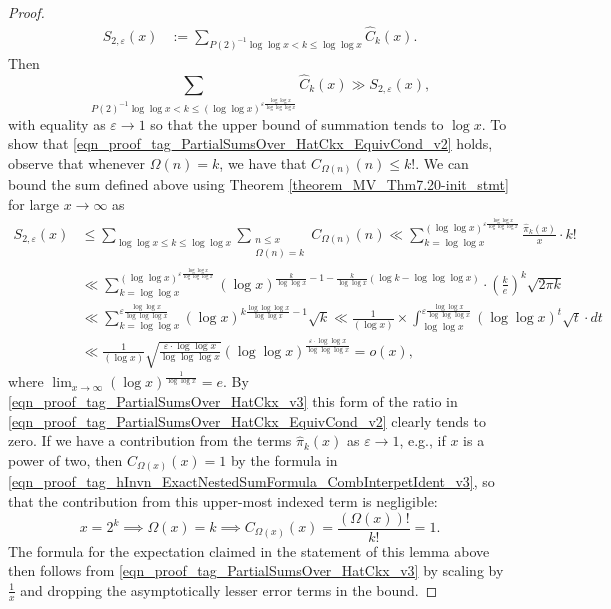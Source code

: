 \documentclass[11pt,reqno,a4letter]{article}
\numberwithin{figure}{section}
\numberwithin{table}{section}
\theoremstyle{plain}
\numberwithin{theorem}{section}
\theoremstyle{definition}
\begin{document}
\begin{proof}
\begin{align*}
S_{2,\varepsilon}(x) & := \sum_{P(2)^{-1} \log\log x < k \leq \log\log x} \widehat{C}_k(x). 
\end{align*} 
Then 
\[
\sum_{P(2)^{-1} \log\log x < k \leq (\log\log x)^{\varepsilon \frac{\log\log x}{\log\log\log x}}} \widehat{C}_k(x) 
     \gg S_{2,\varepsilon}(x),  
\]
with equality as $\varepsilon \rightarrow 1$ so that the upper bound of summation tends to $\log x$. 
To show that \eqref{eqn_proof_tag_PartialSumsOver_HatCkx_EquivCond_v2} holds, 
observe that whenever $\Omega(n) = k$, we have that $C_{\Omega(n)}(n) \leq k!$. 
We can bound the sum defined above using 
Theorem \ref{theorem_MV_Thm7.20-init_stmt} for large $x \rightarrow \infty$ as 
\begin{align*} 
S_{2,\varepsilon}(x) & \leq 
     \sum_{\log\log x \leq k \leq \log\log x} \sum_{\substack{n \leq x \\ \Omega(n)=k}} C_{\Omega(n)}(n) 
     \ll \sum_{k=\log\log x}^{(\log\log x)^{\varepsilon \frac{\log\log x}{\log\log\log x}}} 
      \frac{\widehat{\pi}_k(x)}{x} \cdot k! \\ 
     & \ll \sum_{k=\log\log x}^{(\log\log x)^{\varepsilon \frac{\log\log x}{\log\log\log x}}} 
     (\log x)^{\frac{k}{\log\log x} - 1 - \frac{k}{\log\log x} \left( 
     \log k - \log\log\log x\right)} \cdot \left(\frac{k}{e}\right)^{k} \sqrt{2\pi k} \\ 
     & \ll \sum_{k=\log\log x}^{\varepsilon \frac{\log\log x}{\log\log\log x}} 
     (\log x)^{k \frac{\log\log\log x}{\log\log x} - 1} \sqrt{k} 
     \ll \frac{1}{(\log x)} \times \int_{\log\log x}^{\varepsilon 
     \frac{\log\log x}{\log\log\log x}} (\log\log x)^t \sqrt{t} \cdot dt \\ 
     & \ll \frac{1}{(\log x)} \sqrt{\frac{\varepsilon \cdot \log\log x}{\log\log\log x}} 
     (\log\log x)^{\frac{\varepsilon \cdot \log\log x}{\log\log\log x}} = o(x), 
\end{align*} 
where $\lim_{x \rightarrow \infty} (\log x)^{\frac{1}{\log\log x}} = e$. 
By \eqref{eqn_proof_tag_PartialSumsOver_HatCkx_v3} this 
form of the ratio in \eqref{eqn_proof_tag_PartialSumsOver_HatCkx_EquivCond_v2} clearly tends to zero. 
If we have a contribution from the terms $\widehat{\pi}_k(x)$ as $\varepsilon \rightarrow 1$, 
e.g., if $x$ is a power of two, then $C_{\Omega(x)}(x) = 1$ by the formula in 
\eqref{eqn_proof_tag_hInvn_ExactNestedSumFormula_CombInterpetIdent_v3}, so that 
the contribution from this upper-most indexed term is negligible: 
\[
x=2^k \implies \Omega(x) = k \implies C_{\Omega(x)}(x) = \frac{(\Omega(x))!}{k!} = 1. 
\]
The formula for the expectation claimed in the statement of this lemma above then 
follows from \eqref{eqn_proof_tag_PartialSumsOver_HatCkx_v3} by scaling by 
$\frac{1}{x}$ and dropping the asymptotically lesser error terms in the bound. 
\end{proof} 
\end{document}
